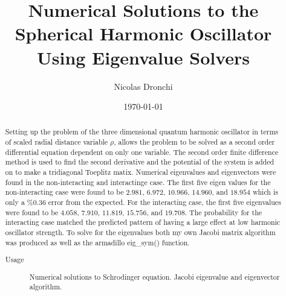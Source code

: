\documentclass[%
 reprint,
 amsmath,amssymb,
 aps,
]{revtex4-1}
\begin{document}

\title{Numerical Solutions to the Spherical Harmonic Oscillator Using Eigenvalue Solvers}%

\author{Nicolas Dronchi}

%

\date{\today}%

\begin{abstract}
Setting up the problem of the three dimensional quantum harmonic oscillator in terms of scaled radial distance variable $\rho$, allows the problem to be solved as a second order differential equation dependent on only one variable. 
The second order finite difference method is used to find the second derivative and the potential of the system is added on to make a tridiagonal Toeplitz matix. Numerical eigenvalues and eigenvectors were found in the non-interacting and interactinge case. The first five eigen values for the non-interacting case were found to be $2.981$, $6.972$, $10.966$, $14.960$, and $18.954$ which is only a \%0.36 error from the expected. For the interacting case, the first five eigenvalues were found to be $4.058$, $7.910$, $11.819$, $15.756$, and $19.708$. The probability for the interacting case matched the predicted pattern of having a large effect at low harmonic oscillator strength. To solve for the eigenvalues both my own Jacobi matrix algorithm was produced as well as the armadillo eig\_sym() function.
\begin{description}
\item[Usage]
Numerical solutions to Schrodinger equation. Jacobi eigenvalue and eigenvector algorithm.

\end{description}
\end{abstract}

\maketitle
\end{document}
